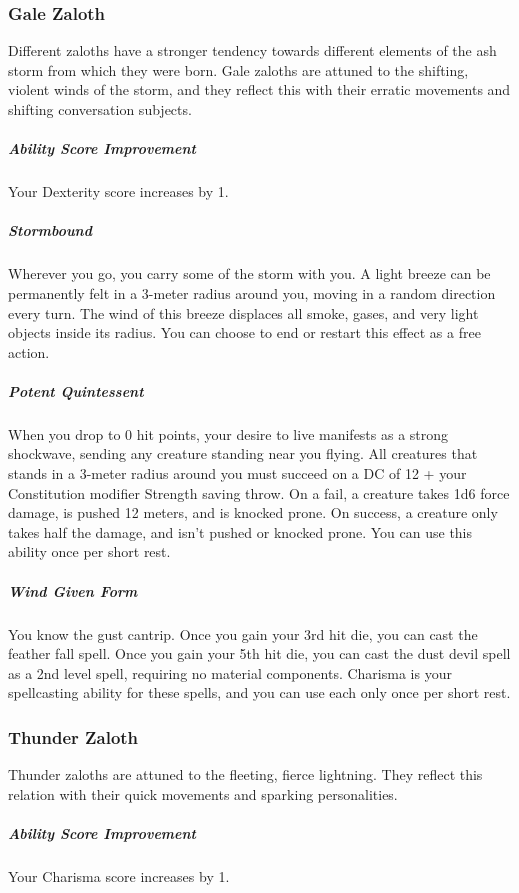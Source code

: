 \subsubsection{Gale Zaloth}
    Different zaloths have a stronger tendency towards different elements of the ash storm from which they were born.
    Gale zaloths are attuned to the shifting, violent winds of the storm, and they reflect this with their erratic movements and shifting conversation subjects.

    \subparagraph{Ability Score Improvement} Your Dexterity score increases by 1.

    \subparagraph{Stormbound} Wherever you go, you carry some of the storm with you.
    A light breeze can be permanently felt in a 3-meter radius around you, moving in a random direction every turn.
    The wind of this breeze displaces all smoke, gases, and very light objects inside its radius.
    You can choose to end or restart this effect as a free action.

    \subparagraph{Potent Quintessent} When you drop to 0 hit points, your desire to live manifests as a strong shockwave, sending any creature standing near you flying.
    All creatures that stands in a 3-meter radius around you must succeed on a DC of 12 + your Constitution modifier Strength saving throw.
    On a fail, a creature takes 1d6 force damage, is pushed 12 meters, and is knocked prone.
    On success, a creature only takes half the damage, and isn't pushed or knocked prone.
    You can use this ability once per short rest.

    \subparagraph{Wind Given Form} You know the gust cantrip.
    Once you gain your 3rd hit die, you can cast the feather fall spell.
    Once you gain your 5th hit die, you can cast the dust devil spell as a 2nd level spell, requiring no material components.
    Charisma is your spellcasting ability for these spells, and you can use each only once per short rest.

\subsubsection{Thunder Zaloth}
    Thunder zaloths are attuned to the fleeting, fierce lightning.
    They reflect this relation with their quick movements and sparking personalities.

    \subparagraph{Ability Score Improvement} Your Charisma score increases by 1.

